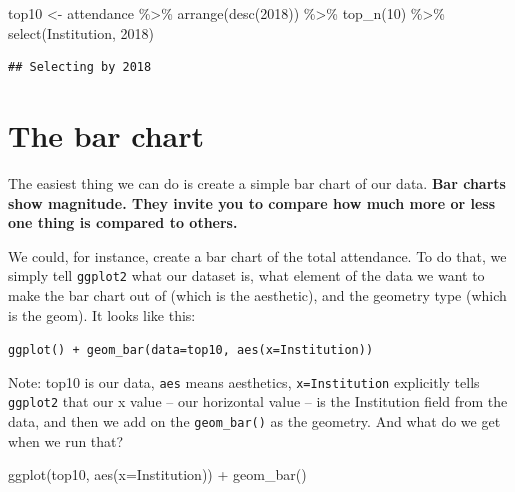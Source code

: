 \documentclass[
]{book}
\newenvironment{Shaded}{\begin{snugshade}}{\end{snugshade}}
\newcommand{\AttributeTok}[1]{\textcolor[rgb]{0.77,0.63,0.00}{#1}}
\newcommand{\DecValTok}[1]{\textcolor[rgb]{0.00,0.00,0.81}{#1}}
\newcommand{\FunctionTok}[1]{\textcolor[rgb]{0.00,0.00,0.00}{#1}}
\newcommand{\NormalTok}[1]{#1}
\newcommand{\OtherTok}[1]{\textcolor[rgb]{0.56,0.35,0.01}{#1}}
\newcommand{\SpecialCharTok}[1]{\textcolor[rgb]{0.00,0.00,0.00}{#1}}
\newcommand{\StringTok}[1]{\textcolor[rgb]{0.31,0.60,0.02}{#1}}
\begin{document}
\begin{Shaded}
\begin{Highlighting}[]
\NormalTok{top10 }\OtherTok{\textless{}{-}}\NormalTok{ attendance }\SpecialCharTok{\%\textgreater{}\%}
  \FunctionTok{arrange}\NormalTok{(}\FunctionTok{desc}\NormalTok{(}\StringTok{\textasciigrave{}}\AttributeTok{2018}\StringTok{\textasciigrave{}}\NormalTok{)) }\SpecialCharTok{\%\textgreater{}\%} 
  \FunctionTok{top\_n}\NormalTok{(}\DecValTok{10}\NormalTok{) }\SpecialCharTok{\%\textgreater{}\%} 
  \FunctionTok{select}\NormalTok{(Institution, }\StringTok{\textasciigrave{}}\AttributeTok{2018}\StringTok{\textasciigrave{}}\NormalTok{)}
\end{Highlighting}
\end{Shaded}

\begin{verbatim}
## Selecting by 2018
\end{verbatim}

\hypertarget{the-bar-chart}{%
\section{The bar chart}\label{the-bar-chart}}

The easiest thing we can do is create a simple bar chart of our data. \textbf{Bar charts show magnitude. They invite you to compare how much more or less one thing is compared to others.}

We could, for instance, create a bar chart of the total attendance. To do that, we simply tell \texttt{ggplot2} what our dataset is, what element of the data we want to make the bar chart out of (which is the aesthetic), and the geometry type (which is the geom). It looks like this:

\texttt{ggplot()\ +\ geom\_bar(data=top10,\ aes(x=Institution))}

Note: top10 is our data, \texttt{aes} means aesthetics, \texttt{x=Institution} explicitly tells \texttt{ggplot2} that our x value -- our horizontal value -- is the Institution field from the data, and then we add on the \texttt{geom\_bar()} as the geometry. And what do we get when we run that?

\begin{Shaded}
\begin{Highlighting}[]
\FunctionTok{ggplot}\NormalTok{(top10, }\FunctionTok{aes}\NormalTok{(}\AttributeTok{x=}\NormalTok{Institution)) }\SpecialCharTok{+} \FunctionTok{geom\_bar}\NormalTok{()}
\end{Highlighting}
\end{Shaded}
\end{document}
